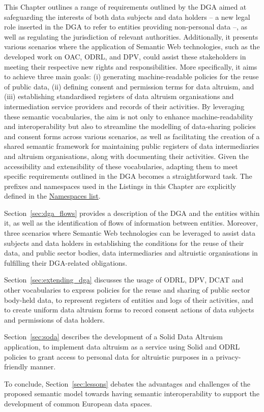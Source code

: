 This Chapter outlines a range of requirements outlined by the DGA aimed at safeguarding the interests of both data subjects and data holders -- a new legal role inserted in the DGA to refer to entities providing non-personal data --, as well as regulating the jurisdiction of relevant authorities. 
Additionally, it presents various scenarios where the application of Semantic Web technologies, such as the developed work on OAC, ODRL, and DPV, could assist these stakeholders in meeting their respective new rights and responsibilities.
More specifically, it aims to achieve three main goals: (i) generating machine-readable policies for the reuse of public data, (ii) defining consent and permission terms for data altruism, and (iii) establishing standardised registers of data altruism organisations and intermediation service providers and records of their activities.
By leveraging these semantic vocabularies, the aim is not only to enhance machine-readability and interoperability but also to streamline the modelling of data-sharing policies and consent forms across various scenarios, as well as facilitating the creation of a shared semantic framework for maintaining public registers of data intermediaries and altruism organisations, along with documenting their activities.
Given the accessibility and extensibility of these vocabularies, adapting them to meet specific requirements outlined in the DGA becomes a straightforward task.
The prefixes and namespaces used in the Listings in this Chapter are explicitly defined in the \hyperref[sec:namespaces]{Namespaces list}.

Section~\ref{sec:dga_flows} provides a description of the DGA and the entities within it, as well as the identification of flows of information between entities.
Moreover, three scenarios where Semantic Web technologies can be leveraged to assist data subjects and data holders in establishing the conditions for the reuse of their data, and public sector bodies, data intermediaries and altruistic organisations in fulfilling their DGA-related obligations. 

Section~\ref{sec:extending_dga} discusses the usage of ODRL, DPV, DCAT and  other vocabularies to express policies for the reuse and sharing of public sector body-held data, to represent registers of entities and logs of their activities, and to create uniform data altruism forms to record consent actions of data subjects and permissions of data holders.

Section~\ref{sec:soda} describes the development of a Solid Data Altruism application, to implement data altruism as a service using Solid and ODRL policies to grant access to personal data for altruistic purposes in a privacy-friendly manner.

To conclude, Section~\ref{sec:lessons} debates the advantages and challenges of the proposed semantic model towards having semantic interoperability to support the development of common European data spaces.




